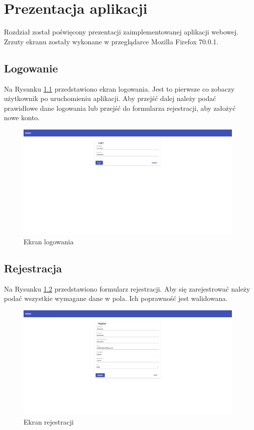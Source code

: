 \chapter{Prezentacja aplikacji}
Rozdział  został  poświęcony  prezentacji  zaimplementowanej  aplikacji webowej. Zrzuty ekranu zostały wykonane w przeglądarce Mozilla Firefox 70.0.1.
\section{Logowanie}
Na Rysunku \ref{fig:logowanie} przedstawiono ekran logowania. Jest to pierwsze co zobaczy użytkownik po uruchomieniu aplikacji. Aby przejść dalej należy podać prawidłowe dane logowania lub przejść do formularza rejestracji, aby założyć nowe konto.

\begin{figure}[H]
\includegraphics[width=\textwidth]{screeny/logowanie.png}
\caption{Ekran logowania}
\label{fig:logowanie}
\end{figure}

\section{Rejestracja}
Na Rysunku \ref{fig:rejestracja} przedstawiono formularz rejestracji. Aby się zarejestrować należy podać wszystkie wymagane dane w pola. Ich poprawność jest walidowana.

\begin{figure}[H]
\includegraphics[width=\textwidth]{screeny/rejestracja.png}
\caption{Ekran rejestracji}
\label{fig:rejestracja}
\end{figure}

